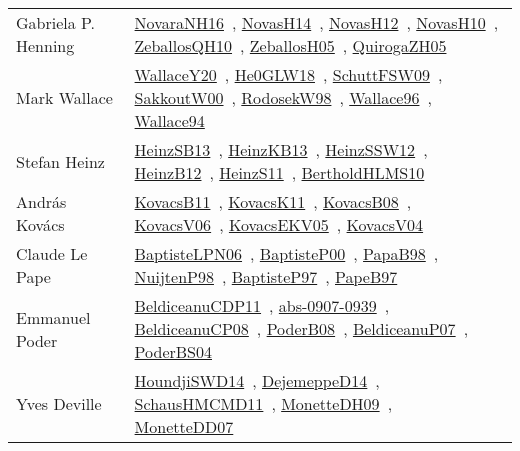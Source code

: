 {\begin{longtable}{p{4cm}p{20cm}}
Gabriela P. Henning & \href{works/NovaraNH16.pdf}{NovaraNH16}~\cite{NovaraNH16}, \href{works/NovasH14.pdf}{NovasH14}~\cite{NovasH14}, \href{works/NovasH12.pdf}{NovasH12}~\cite{NovasH12}, \href{works/NovasH10.pdf}{NovasH10}~\cite{NovasH10}, \href{works/ZeballosQH10.pdf}{ZeballosQH10}~\cite{ZeballosQH10}, \href{works/ZeballosH05.pdf}{ZeballosH05}~\cite{ZeballosH05}, \href{works/QuirogaZH05.pdf}{QuirogaZH05}~\cite{QuirogaZH05}\\
Mark Wallace & \href{works/WallaceY20.pdf}{WallaceY20}~\cite{WallaceY20}, \href{works/He0GLW18.pdf}{He0GLW18}~\cite{He0GLW18}, \href{works/SchuttFSW09.pdf}{SchuttFSW09}~\cite{SchuttFSW09}, \href{works/SakkoutW00.pdf}{SakkoutW00}~\cite{SakkoutW00}, \href{works/RodosekW98.pdf}{RodosekW98}~\cite{RodosekW98}, \href{works/Wallace96.pdf}{Wallace96}~\cite{Wallace96}, \href{}{Wallace94}~\cite{Wallace94}\\
Stefan Heinz & \href{works/HeinzSB13.pdf}{HeinzSB13}~\cite{HeinzSB13}, \href{works/HeinzKB13.pdf}{HeinzKB13}~\cite{HeinzKB13}, \href{works/HeinzSSW12.pdf}{HeinzSSW12}~\cite{HeinzSSW12}, \href{works/HeinzB12.pdf}{HeinzB12}~\cite{HeinzB12}, \href{works/HeinzS11.pdf}{HeinzS11}~\cite{HeinzS11}, \href{works/BertholdHLMS10.pdf}{BertholdHLMS10}~\cite{BertholdHLMS10}\\
Andr{\'{a}}s Kov{\'{a}}cs & \href{works/KovacsB11.pdf}{KovacsB11}~\cite{KovacsB11}, \href{works/KovacsK11.pdf}{KovacsK11}~\cite{KovacsK11}, \href{works/KovacsB08.pdf}{KovacsB08}~\cite{KovacsB08}, \href{works/KovacsV06.pdf}{KovacsV06}~\cite{KovacsV06}, \href{works/KovacsEKV05.pdf}{KovacsEKV05}~\cite{KovacsEKV05}, \href{works/KovacsV04.pdf}{KovacsV04}~\cite{KovacsV04}\\
Claude Le Pape & \href{}{BaptisteLPN06}~\cite{BaptisteLPN06}, \href{works/BaptisteP00.pdf}{BaptisteP00}~\cite{BaptisteP00}, \href{works/PapaB98.pdf}{PapaB98}~\cite{PapaB98}, \href{works/NuijtenP98.pdf}{NuijtenP98}~\cite{NuijtenP98}, \href{works/BaptisteP97.pdf}{BaptisteP97}~\cite{BaptisteP97}, \href{}{PapeB97}~\cite{PapeB97}\\
Emmanuel Poder & \href{works/BeldiceanuCDP11.pdf}{BeldiceanuCDP11}~\cite{BeldiceanuCDP11}, \href{works/abs-0907-0939.pdf}{abs-0907-0939}~\cite{abs-0907-0939}, \href{works/BeldiceanuCP08.pdf}{BeldiceanuCP08}~\cite{BeldiceanuCP08}, \href{works/PoderB08.pdf}{PoderB08}~\cite{PoderB08}, \href{works/BeldiceanuP07.pdf}{BeldiceanuP07}~\cite{BeldiceanuP07}, \href{works/PoderBS04.pdf}{PoderBS04}~\cite{PoderBS04}\\
Yves Deville & \href{works/HoundjiSWD14.pdf}{HoundjiSWD14}~\cite{HoundjiSWD14}, \href{works/DejemeppeD14.pdf}{DejemeppeD14}~\cite{DejemeppeD14}, \href{works/SchausHMCMD11.pdf}{SchausHMCMD11}~\cite{SchausHMCMD11}, \href{works/MonetteDH09.pdf}{MonetteDH09}~\cite{MonetteDH09}, \href{works/MonetteDD07.pdf}{MonetteDD07}~\cite{MonetteDD07}\\

\end{longtable}}
